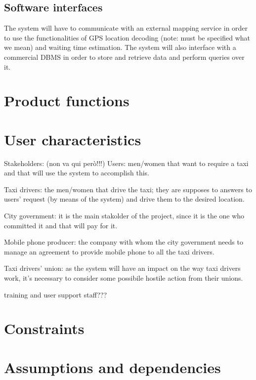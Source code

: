 \subsection{Software interfaces}
The system will have to communicate with an external mapping service in order to use the functionalities of GPS location decoding (note: must be specified what we mean) and waiting time estimation. 
The system will also interface with a commercial DBMS in order to store and retrieve data and perform queries over it.

\section{Product functions}

\section{User characteristics}
Stakeholders: (non va qui però!!!)
Users: men/women that want to require a taxi and that will use the system to accomplish this.

Taxi drivers: the men/women that drive the taxi; they are supposes to answers to users' request (by means of the system) and drive them to the desired location.

City government: it is the main stakolder of the project, since it is the one who committed it and that will pay for it.

Mobile phone producer: the company with whom the city government needs to manage an agreement  to provide mobile phone to all the taxi drivers.

Taxi drivers’ union: as the system will have an impact on the way taxi drivers work, it's necessary to consider some possibile hostile action from their unions.

training and user support staff???

\section{Constraints}

\section{Assumptions and dependencies}
